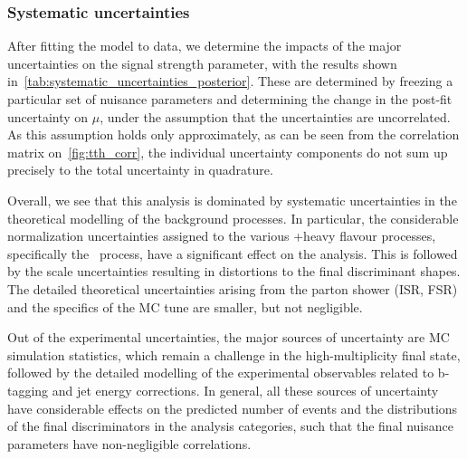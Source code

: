 \subsubsection{Systematic uncertainties}
After fitting the model to data, we determine the impacts of the major uncertainties on the signal strength parameter, with the results shown in~\cref{tab:systematic_uncertainties_posterior}. These are determined by freezing a particular set of nuisance parameters and determining the change in the post-fit uncertainty on $\mu$, under the assumption that the uncertainties are uncorrelated. As this assumption holds only approximately, as can be seen from the correlation matrix on~\cref{fig:tth_corr}, the individual uncertainty components do not sum up precisely to the total uncertainty in quadrature.

Overall, we see that this analysis is dominated by systematic uncertainties in the theoretical modelling of the background processes. In particular, the considerable normalization uncertainties assigned to the various \ttbar+heavy flavour processes, specifically the \ttbb~process, have a significant effect on the analysis. This is followed by the scale uncertainties resulting in distortions to the final discriminant shapes. The detailed theoretical uncertainties arising from the parton shower (ISR, FSR) and the specifics of the MC tune are smaller, but not negligible.

Out of the experimental uncertainties, the major sources of uncertainty are MC simulation statistics, which remain a challenge in the high-multiplicity final state, followed by the detailed modelling of the experimental observables related to b-tagging and jet energy corrections. In general, all these sources of uncertainty have considerable effects on the predicted number of events and the distributions of the final discriminators in the analysis categories, such that the final nuisance parameters have non-negligible correlations.

